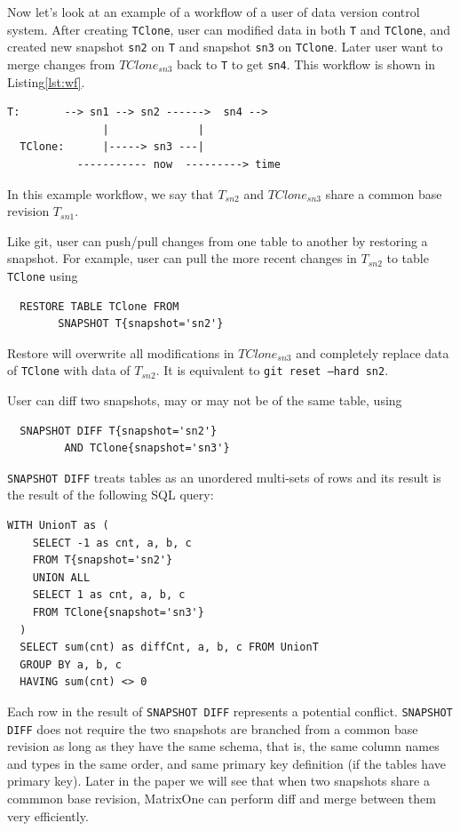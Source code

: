 \documentclass[sigconf,nonacm]{acmart} %
\begin{document}
Now let's look at an example of a workflow of a user of data version 
control system.   After creating \texttt{TClone}, user can modified 
data in both \texttt{T} and \texttt{TClone}, and created new 
snapshot \texttt{sn2} on \texttt{T} and snapshot \texttt{sn3} 
on \texttt{TClone}.  Later user want to merge changes 
from $TClone_{sn3}$ back to \texttt{T} to get 
\texttt{sn4}.  This workflow is shown in Listing\ref{lst:wf}.
\begin{lstlisting}[label=lst:wf,caption=Branching and Merging Workflow]
  T:       --> sn1 --> sn2 ------>  sn4 --> 
               |              |
  TClone:      |-----> sn3 ---|
           ----------- now  ---------> time
\end{lstlisting}
In this example workflow, we say that $T_{sn2}$ and $TClone_{sn3}$ 
share a common base revision $T_{sn1}$. 

Like git, user can push/pull changes from one table to another by 
restoring a snapshot.  For example, user can pull the more recent 
changes in $T_{sn2}$ to table \texttt{TClone} using 
\begin{verbatim}
  RESTORE TABLE TClone FROM
        SNAPSHOT T{snapshot='sn2'}
\end{verbatim}
Restore will overwrite all modifications in $TClone_{sn3}$ and completely replace 
data of \texttt{TClone} with data of $T_{sn2}$.  It is equivalent to 
\texttt{git reset --hard sn2}.

User can diff two snapshots, may or may not be of the same table, using 
\begin{verbatim}
  SNAPSHOT DIFF T{snapshot='sn2'} 
         AND TClone{snapshot='sn3'}
\end{verbatim}  
\texttt{SNAPSHOT DIFF} treats tables as an unordered multi-sets of rows and its result 
is the result of the following SQL query:
\begin{lstlisting}[label=lst:diff,caption=SNAPSHOT DIFF Query]
  WITH UnionT as (
    SELECT -1 as cnt, a, b, c 
    FROM T{snapshot='sn2'}
    UNION ALL
    SELECT 1 as cnt, a, b, c 
    FROM TClone{snapshot='sn3'}
  )
  SELECT sum(cnt) as diffCnt, a, b, c FROM UnionT 
  GROUP BY a, b, c
  HAVING sum(cnt) <> 0
\end{lstlisting}
Each row in the result of \texttt{SNAPSHOT DIFF} represents a potential conflict.
\texttt{SNAPSHOT DIFF} does not require the two snapshots are branched from a 
common base revision as long as they have the same schema, that is, the same 
column names and types in the same order, and same primary key definition 
(if the tables have primary key).  Later in the paper we will see that when  
two snapshots share a commmon base revision, MatrixOne can perform diff and merge 
between them very efficiently.
\end{document}
